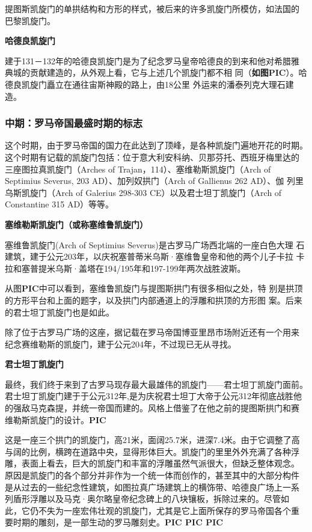 \documentclass[a4paper,dvipdfm]{article}
\begin{document}
提图斯凯旋门的单拱结构和方形的样式，被后来的许多凯旋门所模仿，如法国的
巴黎凯旋门。

\textbf{哈德良凯旋门}

建于131－132年的哈德良凯旋门是为了纪念罗马皇帝哈德良的到来和他对希腊雅
典城的贡献建造的，从外观上看，它与上述几个凯旋门都不相
同（\textbf{如图PIC}）。哈德良凯旋门矗立在通往宙斯神殿的路上，由18公里
外运来的潘泰列克大理石建造。


\subsubsection{中期：罗马帝国最盛时期的标志}

这个时期，由于罗马帝国的国力在此达到了顶峰，是各种凯旋门遍地开花的时期。
这个时期有记载的凯旋门包括：位于意大利安科纳、贝那芬托、西班牙梅里达的
三座图拉真凯旋门（Arches of Trajan，114）、塞维勒斯凯旋门（Arch of
Septimius Severus, 203 AD）、加列奴拱门（Arch of Gallienus 262 AD）、伽
列里乌斯凯旋门（Arch of Galerius 298-303 CE）以及君士坦丁凯旋门（Arch
of Constantine 315 AD）等等。

\textbf{塞维勒斯凯旋门（或称塞维鲁凯旋门）}

塞维鲁凯旋门(Arch of Septimius Severus)是古罗马广场西北端的一座白色大理
石建筑，建于公元203年，以庆祝塞普蒂米乌斯·塞维鲁皇帝和他的两个儿子卡拉
卡拉和塞普提米乌斯·盖塔在194/195年和197-199年两次战胜波斯。

从图\textbf{PIC}中可以看到，塞维鲁凯旋门与提图斯拱门有很多相似之处，特
别是拱顶的方形平台和上面的题字，以及拱门内部通道上的浮雕和拱顶的方形图
案。后来的君士坦丁凯旋门也是如此。

除了位于古罗马广场的这座，据记载在罗马帝国博亚里昂市场附近还有一个用来
纪念赛维勒斯的凯旋门，建于公元204年，不过现已无从寻找。


\textbf{君士坦丁凯旋门}

最终，我们终于来到了古罗马现存最大最雄伟的凯旋门——君士坦丁凯旋门面前。
君士坦丁凯旋门建于于公元312年,是为庆祝君士坦丁大帝于公元312年彻底战胜他
的强敌马克森提，并统一帝国而建的。风格上借鉴了在他之前的提图斯拱门和赛
维勒斯凯旋门的设计。\textbf{PIC}

这是一座三个拱门的凯旋门，高21米，面阔25.7米，进深7.4米。由于它调整了高
与阔的比例，横跨在道路中央，显得形体巨大。凯旋门的里里外外充满了各种浮
雕，表面上看去，巨大的凯旋门和丰富的浮雕虽然气派很大，但缺乏整体观念。
原因是凯旋门的各个部分并非作为一个统一体而创作的，甚至其中的大部分构件
是从过去的一些纪念性建筑，如图拉真广场建筑上的横饰带、哈德良广场上一系
列盾形浮雕以及马克·奥尔略皇帝纪念碑上的八块镶板，拆除过来的。尽管如
此，它仍不失为一座宏伟壮观的凯旋门，尤其是它上面所保存的罗马帝国各个重
要时期的雕刻，是一部生动的罗马雕刻史。\textbf{PIC PIC PIC}
\end{document}
